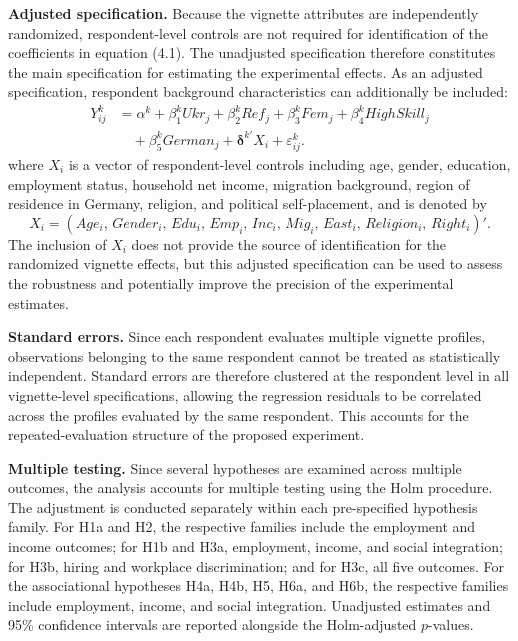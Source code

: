\noindent\textbf{Adjusted specification.} Because the vignette attributes are independently randomized, respondent-level controls are not required for 
identification of the coefficients in equation (4.1). The unadjusted specification therefore constitutes the main 
specification for estimating the experimental effects. As an adjusted specification, respondent background 
characteristics can additionally be included:
\begin{equation}
\begin{aligned}
Y_{ij}^{k}
&= \alpha^{k}
+ \beta_{1}^{k}Ukr_j
+ \beta_{2}^{k}Ref_j
+ \beta_{3}^{k}Fem_j
+ \beta_{4}^{k}HighSkill_j \\
&\quad
+ \beta_{5}^{k}German_j
+ \boldsymbol{\delta}^{k\prime}X_i
+ \varepsilon_{ij}^{k}.
\end{aligned}
\end{equation}
where \(X_i\) is a vector of respondent-level controls including age, gender, education, employment status, household 
net income, migration background, region of residence in Germany, religion, and political self-placement, and is denoted by
\[
X_i =
\left(
Age_i,\,
Gender_i,\,
Edu_i,\,
Emp_i,\,
Inc_i,\,
Mig_i,\,
East_i,\,
Religion_i,\,
Right_i
\right)'.
\]
The inclusion of \(X_i\) does not provide the source of identification for the randomized vignette effects, but this
adjusted specification can be used to assess the robustness and potentially improve the precision of the experimental 
estimates.\bigskip

\noindent\textbf{Standard errors.} Since each respondent evaluates multiple vignette profiles, observations belonging to the same respondent cannot be 
treated as statistically independent. Standard errors are therefore clustered at the respondent level in all 
vignette-level specifications, allowing the regression residuals to be correlated across the profiles evaluated by the 
same respondent. This accounts for the repeated-evaluation structure of the proposed experiment.\bigskip

\noindent\textbf{Multiple testing.} Since several hypotheses are examined across multiple outcomes, the analysis 
accounts for multiple testing using the Holm procedure. The adjustment is conducted separately within each pre-specified 
hypothesis family. For H1a and H2, the respective families include the employment and income outcomes; 
for H1b and H3a, employment, income, and social integration; for H3b, hiring and workplace discrimination; 
and for H3c, all five outcomes. For the associational hypotheses H4a, H4b, H5, H6a, and H6b, the respective 
families include employment, income, and social integration. Unadjusted estimates and 95\% confidence intervals 
are reported alongside the Holm-adjusted \(p\)-values.

